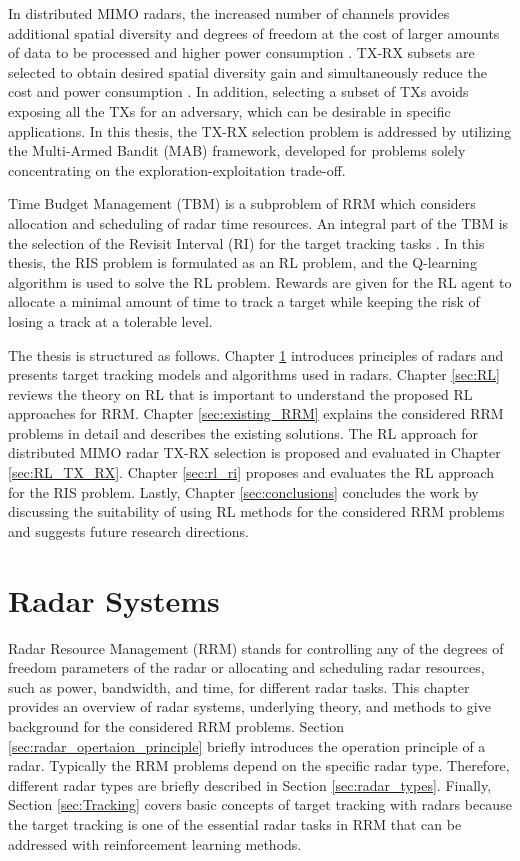 \documentclass[english, 12pt, a4paper, elec, utf8, a-1b, online]{aaltothesis}
\numberwithin{equation}{section}
\begin{document}
In distributed MIMO radars, the increased number of channels provides additional spatial diversity and degrees of freedom at the cost of larger amounts of data to be processed and higher power consumption \cite{Haimovich2008, Aittomäki2011}.
TX-RX subsets are selected to obtain desired spatial diversity gain and simultaneously reduce the cost and power consumption \cite{Godrich2011a, Godrich2011, Sun2014}.
In addition, selecting a subset of TXs avoids exposing all the TXs for an adversary, which can be desirable in specific applications.
In this thesis, the TX-RX selection problem is addressed by utilizing the Multi-Armed Bandit (MAB) framework, developed for problems solely concentrating on the exploration-exploitation trade-off. 

Time Budget Management (TBM) is a subproblem of RRM which considers allocation and scheduling of radar time resources.
An integral part of the TBM is the selection of the Revisit Interval (RI) for the target tracking tasks \cite{Cohen1986, Gardner1988, Munu1992, ChengTing2007, Baek2010, Watson1993, Charlish2015, Keuk1975, Shin1995, Benoudnine2006}.
In this thesis, the RIS problem is formulated as an RL problem, and the Q-learning algorithm is used to solve the RL problem.
Rewards are given for the RL agent to allocate a minimal amount of time to track a target while keeping the risk of losing a track at a tolerable level.

The thesis is structured as follows. 
Chapter \ref{sec:background} introduces principles of radars and presents target tracking models and algorithms used in radars.
Chapter \ref{sec:RL} reviews the theory on RL that is important to understand the proposed RL approaches for RRM. 
Chapter \ref{sec:existing_RRM} explains the considered RRM problems in detail and describes the existing solutions.
The RL approach for distributed MIMO radar TX-RX selection is proposed and evaluated in Chapter \ref{sec:RL_TX_RX}. 
Chapter \ref{sec:rl_ri} proposes and evaluates the RL approach for the RIS problem.
Lastly, Chapter \ref{sec:conclusions} concludes the work by discussing the suitability of using RL methods for the considered RRM problems and suggests future research directions.

\clearpage
\section{Radar Systems}\label{sec:background}

Radar Resource Management (RRM) stands for controlling any of the degrees of freedom parameters of the radar or allocating and scheduling radar resources, such as power, bandwidth, and time, for different radar tasks.
This chapter provides an overview of radar systems, underlying theory, and methods to give background for the considered RRM problems.
Section \ref{sec:radar_opertaion_principle} briefly introduces the operation principle of a radar.
Typically the RRM problems depend on the specific radar type. 
Therefore, different radar types are briefly described in Section \ref{sec:radar_types}. 
Finally, Section \ref{sec:Tracking} covers basic concepts of target tracking with radars because the target tracking is one of the essential radar tasks in RRM that can be addressed with reinforcement learning methods.
\end{document}
